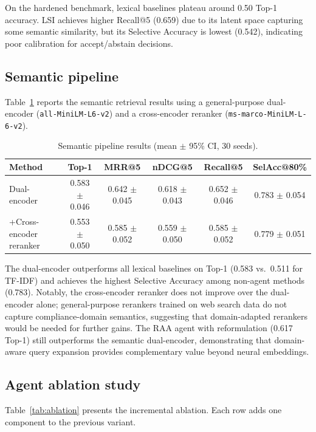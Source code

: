 \documentclass{sn-jnl}
\begin{document}
On the hardened benchmark, lexical baselines plateau around 0.50 Top-1 accuracy.
LSI achieves higher Recall@5 (0.659) due to its latent space capturing some semantic similarity, but its Selective Accuracy is lowest (0.542), indicating poor calibration for accept/abstain decisions.

\subsection{Semantic pipeline}
Table~\ref{tab:semantic} reports the semantic retrieval results using a general-purpose dual-encoder (\texttt{all-MiniLM-L6-v2}) and a cross-encoder reranker (\texttt{ms-marco-MiniLM-L-6-v2}).

\begin{table}[h]
\caption{Semantic pipeline results (mean $\pm$ 95\% CI, 30 seeds).}
\label{tab:semantic}
\centering
\begin{tabular}{lccccc}
\hline
Method & Top-1 & MRR@5 & nDCG@5 & Recall@5 & SelAcc@80\% \\
\hline
Dual-encoder   & 0.583 $\pm$ 0.046 & 0.642 $\pm$ 0.045 & 0.618 $\pm$ 0.043 & 0.652 $\pm$ 0.046 & 0.783 $\pm$ 0.054 \\
+Cross-encoder reranker & 0.553 $\pm$ 0.050 & 0.585 $\pm$ 0.052 & 0.559 $\pm$ 0.050 & 0.585 $\pm$ 0.052 & 0.779 $\pm$ 0.051 \\
\hline
\end{tabular}
\end{table}

The dual-encoder outperforms all lexical baselines on Top-1 (0.583 vs.\ 0.511 for TF-IDF) and achieves the highest Selective Accuracy among non-agent methods (0.783).
Notably, the cross-encoder reranker does not improve over the dual-encoder alone; general-purpose rerankers trained on web search data do not capture compliance-domain semantics, suggesting that domain-adapted rerankers would be needed for further gains.
The RAA agent with reformulation (0.617 Top-1) still outperforms the semantic dual-encoder, demonstrating that domain-aware query expansion provides complementary value beyond neural embeddings.

\subsection{Agent ablation study}
Table~\ref{tab:ablation} presents the incremental ablation.
Each row adds one component to the previous variant.
\end{document}
